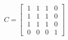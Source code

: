 \documentclass[preview]{standalone}
\begin{document}
\begin{center}
$C=\begin{bmatrix}\
                      1 & 1 & 1 & 0\\\
                      1 & 1 & 1 & 0\\\
                      1 & 1 & 1 & 0\\\
                      0 & 0 & 0 & 1\end{bmatrix}$
\end{center}
\end{document}
